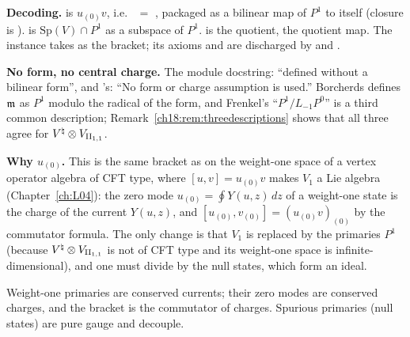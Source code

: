 \begin{dictionary}
\textbf{Decoding.}   is $u_{(0)}v$, i.e.\  $=$
, packaged as a bilinear map of $P^1$ to itself (closure is
).   is $\mathrm{Sp}(V)\cap P^1$ as a subspace of $P^1$.
 is the quotient,  the quotient map.  The  instance takes
 as the bracket; its axioms  and  are discharged by
 and .

\textbf{No form, no central charge.}  The module docstring: ``defined without a bilinear form'', and
's: ``No form or charge assumption is used.''  Borcherds defines $\mathfrak{m}$ as $P^1$ modulo the
radical of the form, and Frenkel's ``$P^1/L_{-1}P^0$'' is a third common description; Remark~\ref{ch18:rem:threedescriptions}
shows that all three agree for ${V^{\natural}}\otimes V_{\mathrm{II}_{1,1}}$.

\textbf{Why $u_{(0)}$.}  This is the same bracket as on the weight-one space of a vertex operator algebra of CFT type, where
$[u,v]=u_{(0)}v$ makes $V_1$ a Lie algebra (Chapter~\ref{ch:L04}): the zero mode $u_{(0)}=\oint Y(u,z)\,dz$ of a weight-one
state is the charge of the current $Y(u,z)$, and $[u_{(0)},v_{(0)}]=(u_{(0)}v)_{(0)}$ by the commutator formula.  The only change
is that $V_1$ is replaced by the primaries $P^1$ (because ${V^{\natural}}\otimes V_{\mathrm{II}_{1,1}}$ is not of CFT type and its weight-one space is
infinite-dimensional), and one must divide by the null states, which form an ideal.
\end{dictionary}
\begin{physics}
Weight-one primaries are conserved currents; their zero modes are conserved charges, and the bracket is
the commutator of charges.  Spurious primaries (null states) are pure gauge and decouple.
\end{physics}

